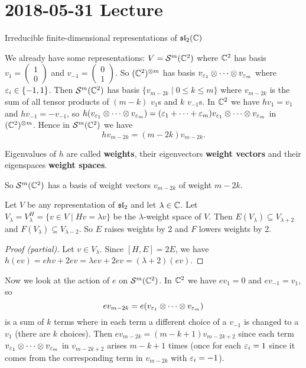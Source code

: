 \section{2018-05-31 Lecture}

Irreducible finite-dimensional representations of $\operatorname{\mathfrak{sl}}_2(\mathbb{C})$

We already have some representations: $V=\mathcal{S}^m(\mathbb{C}^2)$ where $\mathbb{C}^2$ has basis $v_1 = \left( \begin{smallmatrix} 1 \\ 0 \end{smallmatrix} \right)$ and $v_{-1} = \left( \begin{smallmatrix} 0 \\ 1 \end{smallmatrix} \right)$.
So $(\mathbb{C}^2)^{\otimes m}$ has basis $v_{\varepsilon_1} \otimes \cdots \otimes v_{\varepsilon_m}$ where $\varepsilon_i \in \{-1,1\}$.
Then $\mathcal{S}^m(\mathbb{C}^2)$ has basis $\{ v_{m-2k} \mid 0 \leq k \leq m \}$ where $v_{m-2k}$ is the sum of all tensor products of $(m-k)$ $v_1$s and $k$ $v_{-1}$s.
In $\mathbb{C}^2$ we have $hv_1=v_1$ and $hv_{-1}=-v_{-1}$, so $h(v_{\varepsilon_1} \otimes \cdots \otimes v_{\varepsilon_m}) = (\varepsilon_1+\cdots+\varepsilon_m) v_{\varepsilon_1} \otimes \cdots \otimes v_{\varepsilon_m}$ in $(\mathbb{C}^2)^{\otimes m}$.
Hence in $\mathcal{S}^m(\mathbb{C}^2)$ we have
\[ hv_{m-2k}=(m-2k)v_{m-2k}. \]

\begin{defn}
  Eigenvalues of $h$ are called \textbf{weights}, their eigenvectors \textbf{weight vectors} and their eigenspaces \textbf{weight spaces}.
\end{defn}

So $\mathcal{S}^m(\mathbb{C}^2)$ has a basis of weight vectors $v_{m-2k}$ of weight $m-2k$.

\begin{prop}
  Let $V$ be any representation of $\operatorname{\mathfrak{sl}}_2$ and let $\lambda \in \mathbb{C}$.
  Let $V_\lambda = V_\lambda^H = \{ v \in V \mid Hv = \lambda v \}$ be the $\lambda$-weight space of $V$.
  Then $E(V_\lambda) \subseteq V_{\lambda+2}$ and $F(V_\lambda) \subseteq V_{\lambda-2}$.
  So $E$ raises weights by 2 and $F$ lowers weights by 2.
\end{prop}

\begin{proof}[Proof (partial)]
  Let $v \in V_\lambda$.
Since $[H,E]=2E$, we have $h(ev) = ehv+2ev = \lambda ev + 2ev = (\lambda+2)(ev)$.
\end{proof}

Now we look at the action of $e$ on $\mathcal{S}^m(\mathbb{C}^2)$.
In $\mathbb{C}^2$ we have $ev_1=0$ and $ev_{-1}=v_1$, so
\[ ev_{m-2k} = e(v_{\varepsilon_1} \otimes \cdots \otimes v_{\varepsilon_m}) \]
is a sum of $k$ terms where in each term a different choice of a $v_{-1}$ is changed to a $v_1$ (there are $k$ choices).
Then $ev_{m-2k}=(m-k+1)v_{m-2k+2}$ since each term $v_{\varepsilon_1} \otimes \cdots \otimes v_{\varepsilon_m}$ in $v_{m-2k+2}$ arises $m-k+1$ times (once for each $\varepsilon_i=1$ since it comes from the corresponding term in $v_{m-2k}$ with $\varepsilon_i=-1$).

